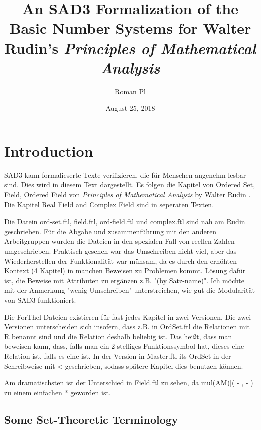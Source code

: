 \documentclass{article}
\begin{document}
\title{An SAD3 Formalization of the Basic Number Systems for Walter Rudin's
\it{Principles of Mathematical Analysis}}

\author{Roman Pl}

\date{August 25, 2018}

\maketitle


\section{Introduction}
SAD3 kann formalieserte Texte verifizieren, die für Menschen angenehm lesbar sind.
Dies wird in diesem Text dargestellt. Es folgen die Kapitel von Ordered Set, Field, Ordered Field von {\it Principles of Mathematical Analysis} by Walter Rudin \cite{Rudin}.
Die Kapitel Real Field and Complex Field sind in seperaten Texten.

Die Datein ord-set.ftl, field.ftl, ord-field.ftl und complex.ftl sind nah am Rudin geschrieben. Für die Abgabe und zusammenführung mit den anderen Arbeitgruppen wurden die Dateien in den spezialen Fall von reellen Zahlen umgeschrieben. Praktisch gesehen war das Umschreiben nicht viel, aber das Wiederherstellen der Funktionalität war mühsam, da es durch den erhöhten Kontext (4 Kapitel) in manchen Beweisen zu Problemen kommt.
Lösung dafür ist, die Beweise mit Attributen zu ergänzen z.B. "(by Satz-name)".
Ich möchte mit der Anmerkung "wenig Umschreiben" unterstreichen, wie gut die Modularität von SAD3 funktioniert.

Die ForThel-Dateien existieren für fast jedes Kapitel in zwei Versionen.
Die zwei Versionen unterscheiden sich insofern, dass z.B. in OrdSet.ftl die Relationen mit R benannt sind und die Relation deshalb beliebig ist. Das heißt, dass man beweisen kann, dass, falls man ein 2-stelliges Funktionssymbol hat, dieses eine Relation ist, falls es eine ist.
In der Version in Master.ftl its OrdSet in der Schreibweise mit < geschrieben, sodass spätere Kapitel dies benutzen können.

Am dramatischsten ist der Unterschied in Field.ftl zu sehen, da mul(AM)[( - , - )] zu einem einfachen * geworden ist.


\subsection{Some Set-Theoretic Terminology}
\end{document}
